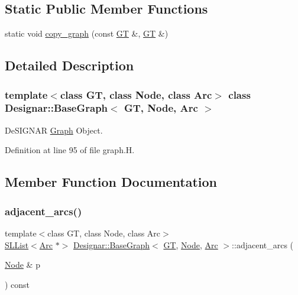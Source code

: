 \subsection*{Static Public Member Functions}
\begin{DoxyCompactItemize}
\item 
static void \hyperlink{class_designar_1_1_base_graph_ac34a3b513973c2ed43067934f71ace28}{copy\+\_\+graph} (const \hyperlink{demo-buildgraph_8_c_a3001c40d2c31ca87ed96cd7d1334a55e}{GT} \&, \hyperlink{demo-buildgraph_8_c_a3001c40d2c31ca87ed96cd7d1334a55e}{GT} \&)
\end{DoxyCompactItemize}


\subsection{Detailed Description}
\subsubsection*{template$<$class GT, class Node, class Arc$>$\newline
class Designar\+::\+Base\+Graph$<$ G\+T, Node, Arc $>$}

De\+S\+I\+G\+N\+AR \hyperlink{class_designar_1_1_graph}{Graph} Object. 

Definition at line 95 of file graph.\+H.



\subsection{Member Function Documentation}
\mbox{\label{class_designar_1_1_base_graph_a2c91912381c8220c0b2530e5ad187231}} 
\subsubsection{\texorpdfstring{adjacent\+\_\+arcs()}{adjacent\_arcs()}}
{\footnotesize\ttfamily template$<$class GT, class Node, class Arc$>$ \\
\hyperlink{class_designar_1_1_s_l_list}{S\+L\+List}$<$\hyperlink{namespace_designar_a3f55fb5513d62ff47cbc8f72b8e95d6f}{Arc} $\ast$$>$ \hyperlink{class_designar_1_1_base_graph}{Designar\+::\+Base\+Graph}$<$ \hyperlink{demo-buildgraph_8_c_a3001c40d2c31ca87ed96cd7d1334a55e}{GT}, \hyperlink{namespace_designar_a5af326c65aa2bd26b26c410f2030d09e}{Node}, \hyperlink{namespace_designar_a3f55fb5513d62ff47cbc8f72b8e95d6f}{Arc} $>$\+::adjacent\+\_\+arcs (\begin{DoxyParamCaption}\item[{\hyperlink{namespace_designar_a5af326c65aa2bd26b26c410f2030d09e}{Node} \&}]{p }\end{DoxyParamCaption}) const\hspace{0.3cm}{\ttfamily [inline]}}



